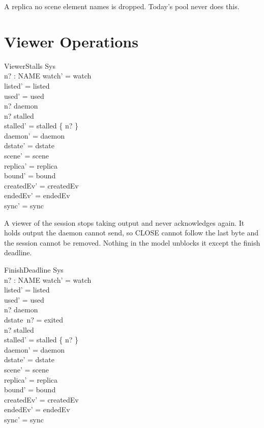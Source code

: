 \documentclass[a4paper,10pt,fleqn]{article}
\begin{document}
A replica no scene element names is dropped.  Today's pool never does
this.

\section{Viewer Operations}

\begin{schema}{ViewerStalls}
  \Delta Sys \\
  n? : NAME
\where
  watch' = watch \\
  listed' = listed \\
  used' = used \\
  n? \in \dom daemon \\
  n? \notin stalled \\
  stalled' = stalled \cup \{ n? \} \\
  daemon' = daemon \\
  dstate' = dstate \\
  scene' = scene \\
  replica' = replica \\
  bound' = bound \\
  createdEv' = createdEv \\
  endedEv' = endedEv \\
  sync' = sync
\end{schema}

A viewer of the session stops taking output and never acknowledges
again.  It holds output the daemon cannot send, so CLOSE cannot follow the
last byte and the session cannot be removed.  Nothing in the model unblocks
it except the finish deadline.

\begin{schema}{FinishDeadline}
  \Delta Sys \\
  n? : NAME
\where
  watch' = watch \\
  listed' = listed \\
  used' = used \\
  n? \in \dom daemon \\
  dstate~n? = exited \\
  n? \in stalled \\
  stalled' = stalled \setminus \{ n? \} \\
  daemon' = daemon \\
  dstate' = dstate \\
  scene' = scene \\
  replica' = replica \\
  bound' = bound \\
  createdEv' = createdEv \\
  endedEv' = endedEv \\
  sync' = sync
\end{schema}
\end{document}
